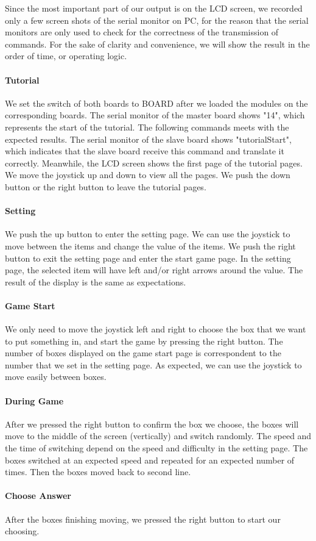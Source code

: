 Since the most important part of our output is on the LCD screen, we recorded only a few screen shots of the serial monitor on PC, for the reason that the serial monitors are only used to check for the correctness of the transmission of commands. For the sake of clarity and convenience, we will show the result in the order of time, or operating logic.

\paragraph{Tutorial}
We set the switch of both boards to BOARD after we loaded the modules on the corresponding boards. The serial monitor of the master board shows "14", which represents the start of the tutorial. The following commands meets with the expected results. The serial monitor of the slave board shows "tutorialStart", which indicates that the slave board receive this command and translate it correctly. Meanwhile, the LCD screen shows the first page of the tutorial pages. We move the joystick up and down to view all the pages. We push the down button or the right button to leave the tutorial pages.
\paragraph{Setting}
We push the up button to enter the setting page. We can use the joystick to move between the items and change the value of the items. We push the right button to exit the setting page and enter the start game page. In the setting page, the selected item will have left and/or right arrows around the value. The result of the display is the same as expectations.
\paragraph{Game Start}
We only need to move the joystick left and right to choose the box that we want to put something in, and start the game by pressing the right button. The number of boxes displayed on the game start page is correspondent to the number that we set in the setting page. As expected, we can use the joystick to move easily between boxes.
\paragraph{During Game}
After we pressed the right button to confirm the box we choose, the boxes will move to the middle of the screen (vertically)  and switch randomly. The speed and the time of switching depend on the speed and difficulty in the setting page. The boxes switched at an expected speed and repeated for an expected number of times. Then the boxes moved back to second line.
\paragraph{Choose Answer}
After the boxes finishing moving, we pressed the right button to start our choosing. 